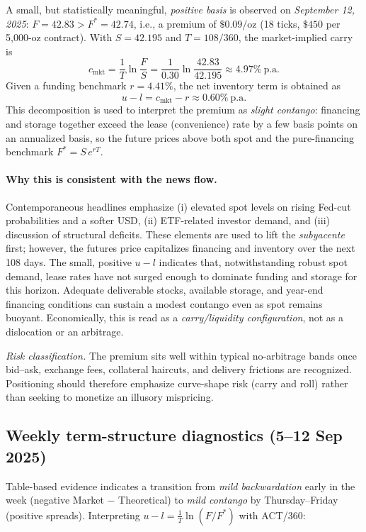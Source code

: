 \documentclass[11pt,a4paper]{article} %
\begin{document}
A small, but statistically meaningful, \emph{positive basis} is observed on \emph{September 12, 2025}: \(F=42.83>F^{*}=42.74\), i.e., a premium of \(\$0.09/\mathrm{oz}\) (18 ticks, \(\$450\) per 5{,}000-oz contract). With \(S=42.195\) and \(T=108/360\), the market-implied carry is
\[
c_{\mathrm{mkt}}=\frac{1}{T}\ln\!\frac{F}{S}=\frac{1}{0.30}\ln\!\frac{42.83}{42.195}\approx 4.97\% \ \text{p.a.}
\]
Given a funding benchmark \(r=4.41\%\), the net inventory term is obtained as
\[
u-l=c_{\mathrm{mkt}}-r\approx 0.60\%\ \text{p.a.}
\]
This decomposition is used to interpret the premium as \emph{slight contango}: financing and storage together exceed the lease (convenience) rate by a few basis points on an annualized basis, so the future prices above both spot and the pure-financing benchmark \(F^{*}=S\,e^{rT}\).


\paragraph{Why this is consistent with the news flow.}
Contemporaneous headlines emphasize (i) elevated spot levels on rising Fed-cut probabilities and a softer USD, (ii) ETF-related investor demand, and (iii) discussion of structural deficits. These elements are used to lift the \emph{subyacente} first; however, the futures price capitalizes financing and inventory over the next 108 days. The small, positive \(u-l\) indicates that, notwithstanding robust spot demand, lease rates have not surged enough to dominate funding and storage for this horizon. Adequate deliverable stocks, available storage, and year-end financing conditions can sustain a modest contango even as spot remains buoyant. Economically, this is read as a \emph{carry/liquidity configuration}, not as a dislocation or an arbitrage.




\medskip
\noindent\emph{Risk classification.} The premium sits well within typical no-arbitrage bands once bid–ask, exchange fees, collateral haircuts, and delivery frictions are recognized. Positioning should therefore emphasize curve-shape risk (carry and roll) rather than seeking to monetize an illusory mispricing.



\subsection{Weekly term-structure diagnostics (5–12 Sep 2025)}
Table-based evidence indicates a transition from \emph{mild backwardation} early in the week (negative Market \(-\) Theoretical) to \emph{mild contango} by Thursday–Friday (positive spreads). Interpreting \(u-l=\tfrac{1}{T}\ln(F/F^{*})\) with ACT/360:
\end{document}
